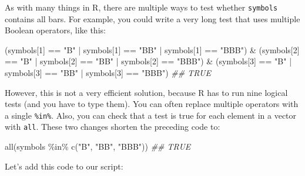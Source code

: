 \documentclass[
  letterpaper,
  DIV=11,
  numbers=noendperiod]{scrbook}
\newenvironment{Shaded}{\begin{snugshade}}{\end{snugshade}}
\newcommand{\DecValTok}[1]{\textcolor[rgb]{0.68,0.00,0.00}{#1}}
\newcommand{\DocumentationTok}[1]{\textcolor[rgb]{0.37,0.37,0.37}{\textit{#1}}}
\newcommand{\FunctionTok}[1]{\textcolor[rgb]{0.28,0.35,0.67}{#1}}
\newcommand{\NormalTok}[1]{\textcolor[rgb]{0.00,0.23,0.31}{#1}}
\newcommand{\SpecialCharTok}[1]{\textcolor[rgb]{0.37,0.37,0.37}{#1}}
\newcommand{\StringTok}[1]{\textcolor[rgb]{0.13,0.47,0.30}{#1}}
\begin{document}
As with many things in R, there are multiple ways to test whether
\texttt{symbols} contains all bars. For example, you could write a very
long test that uses multiple Boolean operators, like this:

\begin{Shaded}
\begin{Highlighting}[]
\NormalTok{(symbols[}\DecValTok{1}\NormalTok{] }\SpecialCharTok{==} \StringTok{"B"} \SpecialCharTok{|}\NormalTok{ symbols[}\DecValTok{1}\NormalTok{] }\SpecialCharTok{==} \StringTok{"BB"} \SpecialCharTok{|}\NormalTok{ symbols[}\DecValTok{1}\NormalTok{] }\SpecialCharTok{==} \StringTok{"BBB"}\NormalTok{) }\SpecialCharTok{\&}
\NormalTok{  (symbols[}\DecValTok{2}\NormalTok{] }\SpecialCharTok{==} \StringTok{"B"} \SpecialCharTok{|}\NormalTok{ symbols[}\DecValTok{2}\NormalTok{] }\SpecialCharTok{==} \StringTok{"BB"} \SpecialCharTok{|}\NormalTok{ symbols[}\DecValTok{2}\NormalTok{] }\SpecialCharTok{==} \StringTok{"BBB"}\NormalTok{) }\SpecialCharTok{\&}
\NormalTok{  (symbols[}\DecValTok{3}\NormalTok{] }\SpecialCharTok{==} \StringTok{"B"} \SpecialCharTok{|}\NormalTok{ symbols[}\DecValTok{3}\NormalTok{] }\SpecialCharTok{==} \StringTok{"BB"} \SpecialCharTok{|}\NormalTok{ symbols[}\DecValTok{3}\NormalTok{] }\SpecialCharTok{==} \StringTok{"BBB"}\NormalTok{)}
\DocumentationTok{\#\# TRUE}
\end{Highlighting}
\end{Shaded}

However, this is not a very efficient solution, because R has to run
nine logical tests (and you have to type them). You can often replace
multiple \texttt{\textbar{}} operators with a single \texttt{\%in\%}.
Also, you can check that a test is true for each element in a vector
with \texttt{all}. These two changes shorten the preceding code to:

\begin{Shaded}
\begin{Highlighting}[]
\FunctionTok{all}\NormalTok{(symbols }\SpecialCharTok{\%in\%} \FunctionTok{c}\NormalTok{(}\StringTok{"B"}\NormalTok{, }\StringTok{"BB"}\NormalTok{, }\StringTok{"BBB"}\NormalTok{))}
\DocumentationTok{\#\# TRUE}
\end{Highlighting}
\end{Shaded}

Let's add this code to our script:
\end{document}
